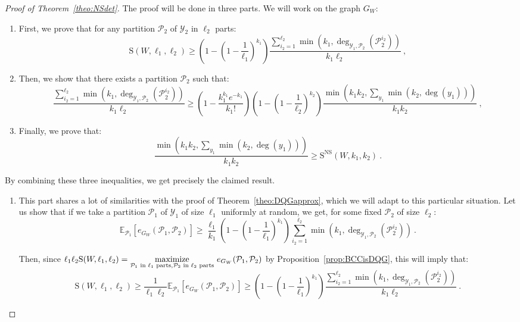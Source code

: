 \begin{proof}[Proof of Theorem~\ref{theo:NSdet}]
  The proof will be done in three parts. We will work on the graph $G_W$:
  \begin{enumerate}
  \item First, we prove that for any partition $\mathcal{P}_2$ of $\mathcal{Y}_2$ in $\ell_2$ parts:
    \[ \mathrm{S}(W,\ell_1,\ell_2) \geq \left(1-\left(1-\frac{1}{\ell_1}\right)^{k_1}\right)\frac{\sum_{i_2=1}^{\ell_2}\min\left(k_1,\deg_{\mathcal{Y}_1,\mathcal{P}_2}(\mathcal{P}_2^{i_2})\right)}{k_1\ell_2} \ , \]
  \item Then, we show that there exists a partition $\mathcal{P}_2$ such that:
    \[ \frac{\sum_{i_2=1}^{\ell_2}\min\left(k_1,\deg_{\mathcal{Y}_1,\mathcal{P}_2}(\mathcal{P}_2^{i_2})\right)}{k_1\ell_2} \geq \left(1 - \frac{k_1^{k_1}e^{-k_1}}{k_1!}\right)\left(1-\left(1-\frac{1}{\ell_2}\right)^{k_2}\right)\frac{\min\left(k_1k_2,\sum_{y_1}\min(k_2,\deg(y_1))\right)}{k_1k_2} \ , \]
  \item Finally, we prove that:
    \[ \frac{\min\left(k_1k_2,\sum_{y_1}\min(k_2,\deg(y_1))\right)}{k_1k_2} \geq \mathrm{S}^{\textrm{NS}}(W,k_1,k_2) \ . \]
  \end{enumerate}

  By combining these three inequalities, we get precisely the claimed result.

  \begin{enumerate}
  \item This part shares a lot of similarities with the proof of Theorem~\ref{theo:DQGapprox}, which we will adapt to this particular situation. Let us show that if we take a partition $\mathcal{P}_1$ of $\mathcal{Y}_1$ of size $\ell_1$ uniformly at random, we get, for some fixed $\mathcal{P}_2$ of size $\ell_2$:
    \[ \mathbb{E}_{\mathcal{P}_1}[e_{G_W}(\mathcal{P}_1,\mathcal{P}_2)] \geq \frac{\ell_1}{k_1}\left(1-\left(1-\frac{1}{\ell_1}\right)^{k_1}\right)\sum_{i_2=1}^{\ell_2}\min\left(k_1,\deg_{\mathcal{Y}_1,\mathcal{P}_2}(\mathcal{P}_2^{i_2})\right) \ .\]

    Then, since $\ell_1\ell_2 \mathrm{S}(W,\ell_1,\ell_2) = \underset{\mathcal{P}_1 \text{ in $\ell_1$ parts},\mathcal{P}_2 \text{ in $\ell_2$ parts}}{\maxi} \ e_{G_W}(\mathcal{P}_1,\mathcal{P}_2)$ by Proposition~\ref{prop:BCCisDQG}, this will imply that:
    \[ \mathrm{S}(W,\ell_1,\ell_2) \geq \frac{1}{\ell_1\ell_2}\mathbb{E}_{\mathcal{P}_1}[e_{G_W}(\mathcal{P}_1,\mathcal{P}_2)] \geq \left(1-\left(1-\frac{1}{\ell_1}\right)^{k_1}\right)\frac{\sum_{i_2=1}^{\ell_2}\min\left(k_1,\deg_{\mathcal{Y}_1,\mathcal{P}_2}(\mathcal{P}_2^{i_2})\right)}{k_1\ell_2} \ .\]


\end{enumerate}
\end{proof}
